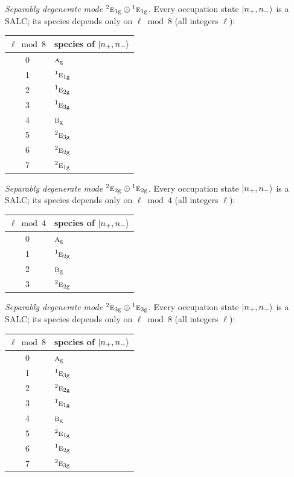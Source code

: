 \documentclass[11pt]{article}
\newcommand{\irr}[1]{\text{\normalfont\scshape #1}}
\newcommand{\conjpair}[1]{{}^{#1}}
\newcommand{\ptag}[1]{\mathrm{#1}}
\begin{document}
\emph{Separably degenerate mode $\conjpair{2}\irr{e}_{1\ptag{g}}\oplus \conjpair{1}\irr{e}_{1\ptag{g}}$.} Every occupation state $\ket{n_+,n_-}$ is a SALC; its species depends only on $\ell\bmod 8$ (all integers $\ell$):
\begin{longtable}{c l}\hline $\ell\bmod 8$ & species of $\ket{n_+,n_-}$\\ \hline\endhead
0 & $\irr{a}_{\ptag{g}}$\\
1 & $\conjpair{1}\irr{e}_{1\ptag{g}}$\\
2 & $\conjpair{1}\irr{e}_{2\ptag{g}}$\\
3 & $\conjpair{1}\irr{e}_{3\ptag{g}}$\\
4 & $\irr{b}_{\ptag{g}}$\\
5 & $\conjpair{2}\irr{e}_{3\ptag{g}}$\\
6 & $\conjpair{2}\irr{e}_{2\ptag{g}}$\\
7 & $\conjpair{2}\irr{e}_{1\ptag{g}}$\\
\hline\end{longtable}

\emph{Separably degenerate mode $\conjpair{2}\irr{e}_{2\ptag{g}}\oplus \conjpair{1}\irr{e}_{2\ptag{g}}$.} Every occupation state $\ket{n_+,n_-}$ is a SALC; its species depends only on $\ell\bmod 4$ (all integers $\ell$):
\begin{longtable}{c l}\hline $\ell\bmod 4$ & species of $\ket{n_+,n_-}$\\ \hline\endhead
0 & $\irr{a}_{\ptag{g}}$\\
1 & $\conjpair{1}\irr{e}_{2\ptag{g}}$\\
2 & $\irr{b}_{\ptag{g}}$\\
3 & $\conjpair{2}\irr{e}_{2\ptag{g}}$\\
\hline\end{longtable}

\emph{Separably degenerate mode $\conjpair{2}\irr{e}_{3\ptag{g}}\oplus \conjpair{1}\irr{e}_{3\ptag{g}}$.} Every occupation state $\ket{n_+,n_-}$ is a SALC; its species depends only on $\ell\bmod 8$ (all integers $\ell$):
\begin{longtable}{c l}\hline $\ell\bmod 8$ & species of $\ket{n_+,n_-}$\\ \hline\endhead
0 & $\irr{a}_{\ptag{g}}$\\
1 & $\conjpair{1}\irr{e}_{3\ptag{g}}$\\
2 & $\conjpair{2}\irr{e}_{2\ptag{g}}$\\
3 & $\conjpair{1}\irr{e}_{1\ptag{g}}$\\
4 & $\irr{b}_{\ptag{g}}$\\
5 & $\conjpair{2}\irr{e}_{1\ptag{g}}$\\
6 & $\conjpair{1}\irr{e}_{2\ptag{g}}$\\
7 & $\conjpair{2}\irr{e}_{3\ptag{g}}$\\
\hline\end{longtable}
\end{document}
